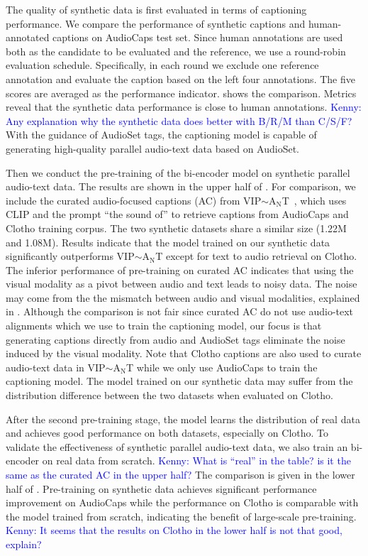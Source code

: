 \documentclass[sigconf,anonymous,review]{acmart}
\newcommand{\KZ}[1]{\textcolor{blue}{Kenny: #1}}
\begin{document}
The quality of synthetic data is first evaluated in terms of captioning performance.
We compare the performance of synthetic captions and human-annotated captions on AudioCaps test set.
Since human annotations are used both as the candidate to be evaluated and the reference, we use a round-robin evaluation schedule.
Specifically, in each round we exclude one reference annotation and evaluate the caption based on the left four annotations.
The five scores are averaged as the performance indicator.
 shows the comparison.
Metrics reveal that the synthetic data performance is close to human annotations.
\KZ{Any explanation why the synthetic data does better with B/R/M than
C/S/F?}
With the guidance of AudioSet tags, the captioning model is capable of generating high-quality parallel audio-text data based on AudioSet.

Then we conduct the pre-training of the bi-encoder model on synthetic parallel audio-text data.
The results are shown in the upper half of .
For comparison, we include the curated audio-focused captions (AC) from VIP$\sim$A$_\text{N}$T~\cite{zhao2021connecting}, which uses CLIP and the prompt ``the sound of'' to retrieve captions from AudioCaps and Clotho training corpus.
The two synthetic datasets share a similar size (1.22M and 1.08M).
Results indicate that the model trained on our synthetic data significantly outperforms VIP$\sim$A$_\text{N}$T except for text to audio retrieval on Clotho.
The inferior performance of pre-training on curated AC indicates that using the visual modality as a pivot between audio and text leads to noisy data.
The noise may come from the the mismatch between audio and visual modalities, 
explained in .
Although the comparison is not fair since curated AC do not use audio-text alignments which we use to train the captioning model, our focus is that generating captions directly from audio and AudioSet tags eliminate the noise induced by the visual modality.
Note that Clotho captions are also used to curate audio-text data in VIP$\sim$A$_\text{N}$T while we only use AudioCaps to train the captioning model.
The model trained on our synthetic data may suffer from the distribution difference between the two datasets when evaluated on Clotho.

After the second pre-training stage, the model learns the distribution of real data and achieves good performance on both datasets, especially on Clotho.
To validate the effectiveness of synthetic parallel audio-text data, 
we also train an bi-encoder on real data from scratch.
\KZ{What is ``real'' in the table? is it the same as the curated AC in the upper
half?}
The comparison is given in the lower half of .
Pre-training on synthetic data achieves significant performance improvement on AudioCaps while the performance on Clotho is comparable with the model trained from scratch, indicating the benefit of large-scale pre-training.
\KZ{It seems that the results on Clotho in the lower half is not that good,
explain?}
\end{document}
